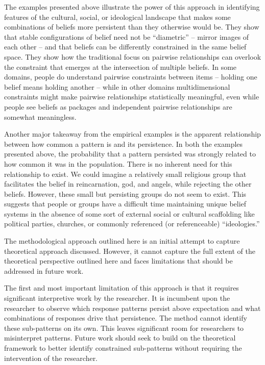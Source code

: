 \documentclass[12pt,]{article}
\begin{document}
The examples presented above illustrate the power of this approach in identifying features of the cultural, social, or ideological landscape that makes some combinations of beliefs more persistent than they otherwise would be. They show that stable configurations of belief need not be ``diametric'' -- mirror images of each other -- and that beliefs can be differently constrained in the same belief space. They show how the traditional focus on pairwise relationships can overlook the constraint that emerges at the intersection of multiple beliefs. In some domains, people do understand pairwise constraints between items -- holding one belief means holding another -- while in other domains multidimensional constraints might make pairwise relationships statistically meaningful, even while people see beliefs as packages and independent pairwise relationships are somewhat meaningless.

Another major takeaway from the empirical examples is the apparent relationship between how common a pattern is and its persistence. In both the examples presented above, the probability that a pattern persisted was strongly related to how common it was in the population. There is no inherent need for this relationship to exist. We could imagine a relatively small religious group that facilitates the belief in reincarnation, god, and angels, while rejecting the other beliefs. However, these small but persisting groups do not seem to exist. This suggests that people or groups have a difficult time maintaining unique belief systems in the absence of some sort of external social or cultural scaffolding like political parties, churches, or commonly referenced (or referenceable) ``ideologies.''

The methodological approach outlined here is an initial attempt to capture theoretical approach discussed. However, it cannot capture the full extent of the theoretical perspective outlined here and faces limitations that should be addressed in future work.

The first and most important limitation of this approach is that it requires significant interpretive work by the researcher. It is incumbent upon the researcher to observe which response patterns persist above expectation and what combinations of responses drive that persistence. The method cannot identify these sub-patterns on its own. This leaves significant room for researchers to misinterpret patterns. Future work should seek to build on the theoretical framework to better identify constrained sub-patterns without requiring the intervention of the researcher.
\end{document}
